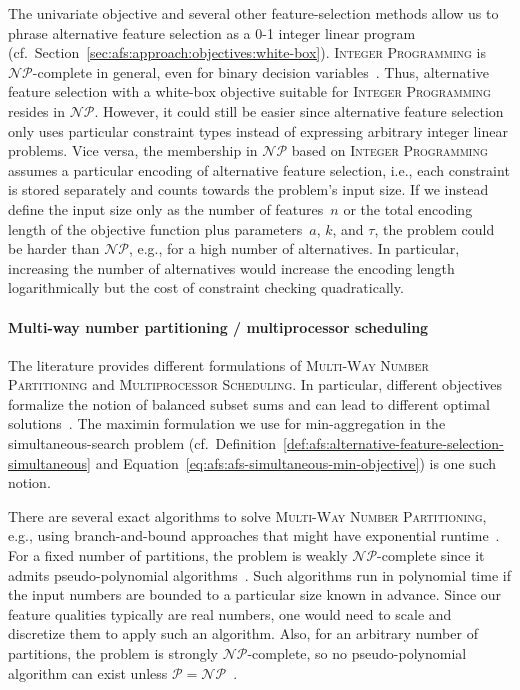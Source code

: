 \documentclass{article}
\theoremstyle{definition}
\begin{document}
The univariate objective and several other feature-selection methods allow us to phrase alternative feature selection as a 0-1 integer linear program (cf.~Section~\ref{sec:afs:approach:objectives:white-box}).
\textsc{Integer Programming} is $\mathcal{NP}$-complete in general, even for binary decision variables~\cite{garey2003computers, karp1972reducibility}.
Thus, alternative feature selection with a white-box objective suitable for \textsc{Integer Programming} resides in $\mathcal{NP}$.
However, it could still be easier since alternative feature selection only uses particular constraint types instead of expressing arbitrary integer linear problems.
Vice versa, the membership in $\mathcal{NP}$ based on \textsc{Integer Programming} assumes a particular encoding of alternative feature selection, i.e., each constraint is stored separately and counts towards the problem's input size.
If we instead define the input size only as the number of features~$n$ or the total encoding length of the objective function plus parameters~$a$, $k$, and $\tau$, the problem could be harder than $\mathcal{NP}$, e.g., for a high number of alternatives.
In particular, increasing the number of alternatives would increase the encoding length logarithmically but the cost of constraint checking quadratically.

\paragraph{Multi-way number partitioning / multiprocessor scheduling}

The literature provides different formulations of \textsc{Multi-Way Number Partitioning} and \textsc{Multiprocessor Scheduling}.
In particular, different objectives formalize the notion of balanced subset sums and can lead to different optimal solutions~\cite{korf2010objective, lawrinenko2017identical}.
The maximin formulation we use for min-aggregation in the simultaneous-search problem (cf.~Definition~\ref{def:afs:alternative-feature-selection-simultaneous} and Equation~\ref{eq:afs:afs-simultaneous-min-objective}) is one such notion.

There are several exact algorithms to solve \textsc{Multi-Way Number Partitioning}, e.g., using branch-and-bound approaches that might have exponential runtime~\cite{haouari2008maximizing, schreiber2018optimal, walter2017improved}.
For a fixed number of partitions, the problem is weakly $\mathcal{NP}$-complete since it admits pseudo-polynomial algorithms~\cite{garey2003computers, korf2009multi}.
Such algorithms run in polynomial time if the input numbers are bounded to a particular size known in advance.
Since our feature qualities typically are real numbers, one would need to scale and discretize them to apply such an algorithm.
Also, for an arbitrary number of partitions, the problem is strongly $\mathcal{NP}$-complete, so no pseudo-polynomial algorithm can exist unless $\mathcal{P}=\mathcal{NP}$~\cite{garey2003computers}.
\end{document}
